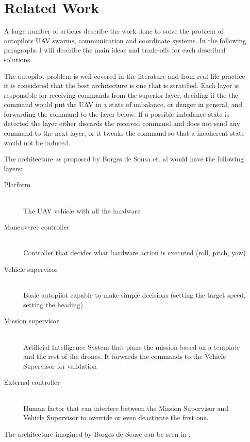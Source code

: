 \chapter{Related Work}
\label{chapter:related-work}

A large number of articles describe the work done to solve the problem of autopilots
UAV swarms, communication and coordinate systems. In the following paragraphs
I will describe the main ideas and trade-offs for each described solutions.

The autopilot problem is well covered in the literature and from real life practice
it is considered that the best architecture is one that is stratified. Each layer
is responsible for receiving commands from the superior layer, deciding if the
the command would put the UAV in a state of imbalance, or danger in general, and
forwarding the command to the layer below. If a possible imbalance state is detected
the layer either discards the received command and does not send any command to 
the next layer, or it tweaks the command so that a incoherent state would not
be induced.

The architecture as proposed by Borges de Sousa et. al \cite{pivant} would have
the following layers:

\begin{description}
\item[Platform] \hfill \\ The UAV vehicle with all the hardware
\item[Maneuverer controller] \hfill \\ Controller that decides what hardware action is 
executed (roll, pitch, yaw)
\item[Vehicle supervisor] \hfill \\ Basic autopilot capable to make simple decisions 
(setting the target speed, setting the heading)
\item[Mission supervisor] \hfill \\ Artificial Intelligence System that plans the mission
based on a template and the rest of the drones. It forwards the commands to the
Vehicle Supervisor for validation
\item[External controller] \hfill \\ Human factor that can interfere between the Mission
Supervisor and Vehicle Supervisor to override or even deactivate the first one.
\end{description}

The architecture imagined by Borges de Souse can be seen in .

